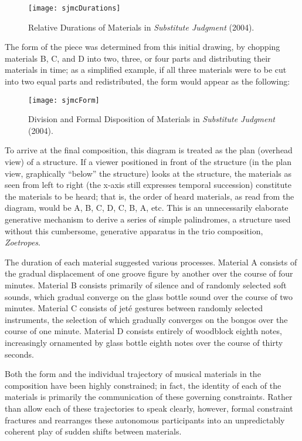 \begin{figure}[H] 
\texttt{[image: sjmcDurations]}
\caption{Relative Durations of Materials in \emph{Substitute Judgment} (2004). } 
\end{figure}

The form of the piece was determined from this initial drawing, by chopping materials B, C, and D into two, three, or four parts and distributing their materials in time; as a simplified example, if all three materials were to be cut into two equal parts and redistributed, the form would appear as the following:

\begin{figure}[H] 
\texttt{[image: sjmcForm]}
\caption{Division and Formal Disposition of Materials in \emph{Substitute Judgment} (2004). } 
\end{figure}

To arrive at the final composition, this diagram is treated as the plan (overhead view) of a structure. If a viewer positioned in front of the structure (in the plan view, graphically ``below'' the structure) looks at the structure, the materials as seen from left to right (the x-axis still expresses temporal succession) constitute the materials to be heard; that is, the order of heard materials, as read from the diagram, would be A, B, C, D, C, B, A, etc. This is an unnecessarily elaborate generative mechanism to derive a series of simple palindromes, a structure used without this cumbersome, generative apparatus in the trio composition, \emph{Zoetropes}.

The duration of each material suggested various processes. Material A consists of the gradual displacement of one groove figure by another over the course of four minutes. Material B consists primarily of silence and of randomly selected soft sounds, which gradual converge on the glass bottle sound over the course of two minutes. Material C consists of jet\'{e} gestures between randomly selected instruments, the selection of which gradually converges on the bongos over the course of one minute. Material D consists entirely of woodblock eighth notes, increasingly ornamented by glass bottle eighth notes over the course of thirty seconds. 

Both the form and the individual trajectory of musical materials in the composition have been highly constrained; in fact, the identity of each of the materials is primarily the communication of these governing constraints. Rather than allow each of these trajectories to speak clearly, however, formal constraint fractures and rearranges these autonomous participants into an unpredictably coherent play of sudden shifts between materials. 

